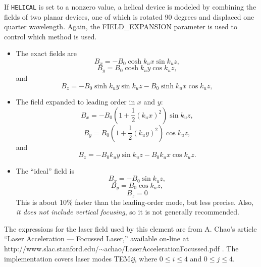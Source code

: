 If \verb|HELICAL| is set to a nonzero value, a helical device is modeled by combining the
fields of two planar devices, one of which is rotated 90 degrees and displaced one quarter
wavelength.
Again, the FIELD\_EXPANSION parameter is used to control which method is used.
\begin{itemize}
\item The exact fields are
\begin{equation}
B_x = -B_0 \cosh k_u x \sin k_u z ,
\end{equation}
\begin{equation}
B_y = B_0 \cosh k_u y \cos k_u z,
\end{equation}
and
\begin{equation}
B_z = -B_0 \sinh k_u y \sin k_u z -B_0 \sinh k_u x \cos k_u z,
\end{equation}

\item The field expanded to leading order in $x$ and $y$:
\begin{equation}
B_x = -B_0 ( 1 + \frac{1}{2}(k_u x)^2 ) \sin k_u z,
\end{equation}
\begin{equation}
B_y = B_0 ( 1 + \frac{1}{2}(k_u y)^2 ) \cos k_u z,
\end{equation}
and
\begin{equation}
B_z = -B_0 k_u y \sin k_u z -B_0 k_u x \cos k_u z.
\end{equation}

\item The ``ideal'' field is
\begin{equation}
B_x = -B_0 \sin k_u z,
\end{equation}
\begin{equation}
B_y = B_0 \cos k_u z,
\end{equation}
\begin{equation}
B_z = 0
\end{equation}
This is about 10\% faster than the leading-order mode, but less
precise.  Also, {\em it does not include vertical focusing}, so it is
not generally recommended.

\end{itemize}

The expressions for the laser field used by this element are from
A. Chao's article ``Laser Acceleration --- Focussed Laser,'' available
on-line at \\
http://www.slac.stanford.edu/$\sim$achao/LaserAccelerationFocussed.pdf .
The implementation covers laser modes TEM{\em ij}, where
$0\leq i \leq 4$ and $0 \leq j \leq 4$.

